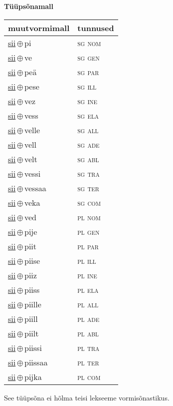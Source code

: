 

\vspace{3.5em}
\noindent \begin{minipage}{\textwidth}
\noindent \textbf{Tüüpsõnamall \,}\\

\begin{sideways}
\begin{tabular}{l l}
muutvormimall & tunnused \\
\hline
\underline{sii}\,$\oplus$\,pi & \textsc{ sg nom } \\
\underline{sii}\,$\oplus$\,ve & \textsc{ sg gen } \\
\underline{sii}\,$\oplus$\,peä & \textsc{ sg par } \\
\underline{sii}\,$\oplus$\,pese & \textsc{ sg ill } \\
\underline{sii}\,$\oplus$\,vez & \textsc{ sg ine } \\
\underline{sii}\,$\oplus$\,vess & \textsc{ sg ela } \\
\underline{sii}\,$\oplus$\,velle & \textsc{ sg all } \\
\underline{sii}\,$\oplus$\,vell & \textsc{ sg ade } \\
\underline{sii}\,$\oplus$\,velt & \textsc{ sg abl } \\
\underline{sii}\,$\oplus$\,vessi & \textsc{ sg tra } \\
\underline{sii}\,$\oplus$\,vessaa & \textsc{ sg ter } \\
\underline{sii}\,$\oplus$\,veka & \textsc{ sg com } \\
\underline{sii}\,$\oplus$\,ved & \textsc{ pl nom } \\
\underline{sii}\,$\oplus$\,pije & \textsc{ pl gen } \\
\underline{sii}\,$\oplus$\,piit & \textsc{ pl par } \\
\underline{sii}\,$\oplus$\,piise & \textsc{ pl ill } \\
\underline{sii}\,$\oplus$\,piiz & \textsc{ pl ine } \\
\underline{sii}\,$\oplus$\,piiss & \textsc{ pl ela } \\
\underline{sii}\,$\oplus$\,piille & \textsc{ pl all } \\
\underline{sii}\,$\oplus$\,piill & \textsc{ pl ade } \\
\underline{sii}\,$\oplus$\,piilt & \textsc{ pl abl } \\
\underline{sii}\,$\oplus$\,piissi & \textsc{ pl tra } \\
\underline{sii}\,$\oplus$\,piissaa & \textsc{ pl ter } \\
\underline{sii}\,$\oplus$\,pijka & \textsc{ pl com } \\
\end{tabular}
\end{sideways}
\label{tab:tüüpsõnamall-siipi}

\end{minipage}

 
\vspace{1em}
\noindent See tüüpsõna ei hõlma teisi lekseeme vormi\-sõnastikus.
